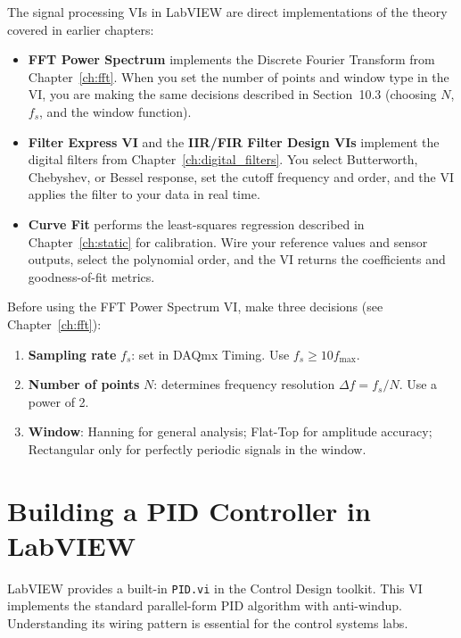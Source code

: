 The signal processing VIs in LabVIEW are direct implementations of the theory covered in earlier chapters:

\begin{itemize}[leftmargin=1.5em]
\item \textbf{FFT Power Spectrum} implements the Discrete Fourier Transform from Chapter~\ref{ch:fft}. When you set the number of points and window type in the VI, you are making the same decisions described in Section~10.3 (choosing $N$, $f_s$, and the window function).
\item \textbf{Filter Express VI} and the \textbf{IIR/FIR Filter Design VIs} implement the digital filters from Chapter~\ref{ch:digital_filters}. You select Butterworth, Chebyshev, or Bessel response, set the cutoff frequency and order, and the VI applies the filter to your data in real time.
\item \textbf{Curve Fit} performs the least-squares regression described in Chapter~\ref{ch:static} for calibration. Wire your reference values and sensor outputs, select the polynomial order, and the VI returns the coefficients and goodness-of-fit metrics.
\end{itemize}

\begin{tipbox}
Before using the FFT Power Spectrum VI, make three decisions (see Chapter~\ref{ch:fft}):
\begin{enumerate}[nosep,leftmargin=1.5em]
\item \textbf{Sampling rate} $f_s$: set in DAQmx Timing. Use $f_s \geq 10 f_{\max}$.
\item \textbf{Number of points} $N$: determines frequency resolution $\Delta f = f_s / N$. Use a power of 2.
\item \textbf{Window}: Hanning for general analysis; Flat-Top for amplitude accuracy; Rectangular only for perfectly periodic signals in the window.
\end{enumerate}
\end{tipbox}

\section{Building a PID Controller in LabVIEW}
\label{sec:lv_pid}

LabVIEW provides a built-in \texttt{PID.vi} in the Control Design toolkit. This VI implements the standard parallel-form PID algorithm with anti-windup. Understanding its wiring pattern is essential for the control systems labs.

